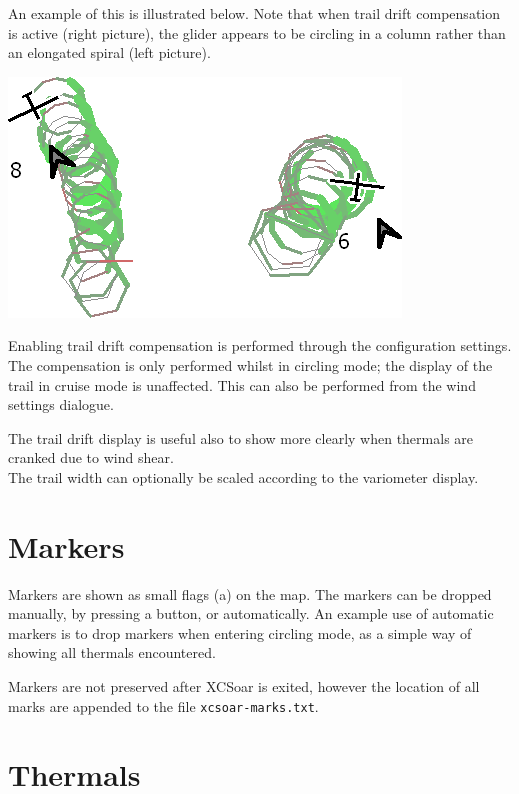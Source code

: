 An example of this is illustrated below.  Note that when trail drift
compensation is active (right picture), the glider appears to be
circling in a column rather than an elongated spiral (left picture).

\begin{center}
\includegraphics[angle=0,width=0.6\linewidth,keepaspectratio='true']{figures/traildrift.png}
\end{center}

Enabling trail drift compensation is performed through the
configuration settings.  The compensation is only performed
whilst in circling mode; the display of the trail in cruise mode is unaffected.
This can also be performed from the wind settings dialogue.

The trail drift display is useful also to show more clearly when thermals
are cranked due to wind shear.\\
The trail width can optionally be scaled according to the variometer display.

\section{Markers}\label{sec:markers}

Markers are shown as small flags (a) on the map.  The markers can be dropped
manually, by pressing a button, or automatically.  An example use of
automatic markers is to drop markers when entering circling mode, as a
simple way of showing all thermals encountered.

Markers are not preserved after XCSoar is exited, however the location
of all marks are appended to the file \verb|xcsoar-marks.txt|.

\section{Thermals}

